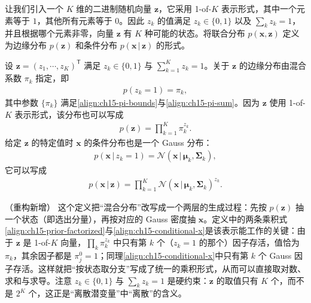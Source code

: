 \documentclass[../../main.tex]{subfiles}
\begin{document}
让我们引入一个 $K$ 维的二进制随机向量 $\bm{z}$，它采用 1-of-$K$ 表示形式，其中一个元素等于 $1$，其他所有元素等于 $0$。因此 $z_k$ 的值满足 $z_k\in\{0,1\}$ 以及 $\sum_k z_k=1$，并且根据哪个元素非零，向量 $\bm{z}$ 有 $K$ 种可能的状态。将联合分布 $p(\bm{x},\bm{z})$ 定义为边缘分布 $p(\bm{z})$ 和条件分布 $p(\bm{x}\,|\,\bm{z})$ 的形式。

\begin{definition}[1-of-$K$ 离散潜变量表示]\label{definition:ch15-离散潜变量}
设 $\bm{z}=(z_1,\cdots,z_K)^{\mathsf T}$ 满足 $z_k\in\{0,1\}$ 与 $\sum_{k=1}^{K}z_k=1$。关于 $\bm{z}$ 的边缘分布由混合系数 $\pi_k$ 指定，即
\begin{align*}
p(z_k=1)=\pi_k,
\end{align*}
其中参数 $\{\pi_k\}$ 满足\eqref{align:ch15-pi-bounds}与\eqref{align:ch15-pi-sum}。因为 $\bm{z}$ 使用 1-of-$K$ 表示形式，该分布也可以写成
\begin{align}
p(\bm{z})=\prod_{k=1}^{K}\pi_k^{z_k}.
\label{align:ch15-prior-factorized}
\end{align}
给定 $\bm{z}$ 的特定值时 $\bm{x}$ 的条件分布也是一个 Gauss 分布：
\begin{align*}
p(\bm{x}\,|\,z_k=1)=\mathcal{N}(\bm{x}\,|\,\bm{\mu}_k,\bm{\Sigma}_k),
\end{align*}
它可以写成
\begin{align}
p(\bm{x}\,|\,\bm{z})=\prod_{k=1}^{K}\mathcal{N}(\bm{x}\,|\,\bm{\mu}_k,\bm{\Sigma}_k)^{z_k}.
\label{align:ch15-conditional-x}
\end{align}
\end{definition}

\begin{remark}（重构新增）
这个定义把“混合分布”改写成一个两层的生成过程：先按 $p(\bm{z})$ 抽一个状态（即选出分量），再按对应的 Gauss 密度抽 $\bm{x}$。定义中的两条乘积式\eqref{align:ch15-prior-factorized}与\eqref{align:ch15-conditional-x}是该表示能工作的关键：由于 $\bm{z}$ 是 1-of-$K$ 向量，$\prod_k\pi_k^{z_k}$ 中只有第 $k$ 个（$z_k=1$ 的那个）因子存活，值恰为 $\pi_k$，其余因子都是 $\pi_j^{0}=1$；同理\eqref{align:ch15-conditional-x}中只有第 $k$ 个 Gauss 因子存活。这样就把“按状态取分支”写成了统一的乘积形式，从而可以直接取对数、求和与求导。注意 $z_k\in\{0,1\}$ 与 $\sum_kz_k=1$ 是硬约束：$\bm{z}$ 的取值只有 $K$ 个，而不是 $2^{K}$ 个，这正是“离散潜变量”中“离散”的含义。
\end{remark}
\end{document}
